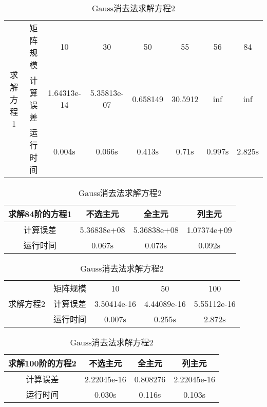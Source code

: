 \documentclass{article}
\begin{document}
\begin{table}[H]
	\centering
	\begin{tabular}{cccccccc}
		\hline
		\multirow{3}{*}{求解方程1} & 矩阵规模 & 10          & 30          & 50       & 55      & 56     & 84     \\ \cline{2-8} 
		& 计算误差 & 1.64313e-14 & 5.35813e-07 & 0.658149 & 30.5912 & inf    & inf    \\
		& 运行时间 & 0.004s      & 0.066s      & 0.413s   & 0.71s   & 0.997s & 2.825s \\ \hline
	\end{tabular}
	\caption{QR分解求解方程1}
	\label{tab:my-table}
	
	\begin{table}[H]
		\centering
		\begin{tabular}{@{}cccc@{}}
			\toprule
			求解84阶的方程1 & 不选主元        & 全主元         & 列主元         \\ \midrule
			计算误差      & 5.36838e+08 & 5.36838e+08 & 1.07374e+09 \\
			运行时间      & 0.067s      & 0.073s      & 0.092s      \\ \bottomrule
		\end{tabular}
		\caption{Gauss消去求解方程1}
		\label{tab:my-table}
	\end{table}
	
	\begin{table}[H]
		\centering
		\begin{tabular}{ccccc}
			\hline
			\multirow{3}{*}{求解方程2} & 矩阵规模 & 10          & 50          & 100         \\ \cline{2-5} 
			& 计算误差 & 3.50414e-16 & 4.44089e-16 & 5.55112e-16 \\
			& 运行时间 & 0.007s      & 0.255s      & 2.872s      \\ \hline
		\end{tabular}
		\caption{QR分解求解方程2}
		\label{tab:my-table}
	\end{table}
	
	\begin{table}[H]
		\centering
		\begin{tabular}{cccc}
			\hline
			求解100阶的方程2 & 不选主元        & 全主元      & 列主元         \\ \hline
			计算误差       & 2.22045e-16 & 0.808276 & 2.22045e-16 \\
			运行时间       & 0.030s      & 0.116s   & 0.103s      \\ \hline
		\end{tabular}
		\caption{Gauss消去法求解方程2}
		\label{tab:my-table}
	\end{table}
	

\end{table}
\end{document}
